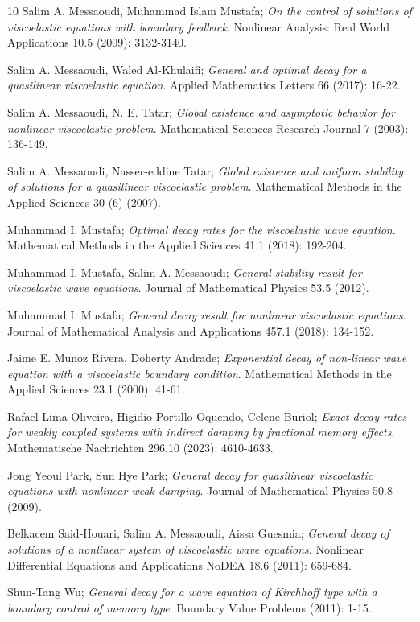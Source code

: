 \documentclass[11pt]{article}
\numberwithin{equation}{section}
\begin{document}
\begin{thebibliography}{10}
 Salim A. Messaoudi,  Muhammad Islam Mustafa;
\emph{On the control of solutions of viscoelastic equations with boundary feedback}.
 Nonlinear Analysis: Real World Applications 10.5 (2009): 3132-3140.
 
 Salim A. Messaoudi, Waled Al-Khulaifi;
\emph{General and optimal decay for a quasilinear viscoelastic equation}.
Applied Mathematics Letters 66 (2017): 16-22.

 Salim A. Messaoudi,  N. E. Tatar;
\emph{Global existence and asymptotic behavior for nonlinear viscoelastic problem}.
 Mathematical Sciences Research Journal 7 (2003): 136-149.
 
 Salim A. Messaoudi,  Nasser-eddine Tatar;
\emph{Global existence and uniform stability of solutions for a quasilinear 
viscoelastic problem}. Mathematical Methods in the Applied Sciences 30 (6) (2007).

 Muhammad I. Mustafa;
\emph{Optimal decay rates for the viscoelastic wave equation}.
 Mathematical Methods in the Applied Sciences 41.1 (2018): 192-204.
 
 Muhammad I. Mustafa, Salim A. Messaoudi;
\emph{General stability result for viscoelastic wave equations}.
 Journal of Mathematical Physics 53.5 (2012).
 
 Muhammad I. Mustafa;
\emph{General decay result for nonlinear viscoelastic equations}.
 Journal of Mathematical Analysis and Applications 457.1 (2018): 134-152.
 
  Jaime E. Munoz Rivera, Doherty Andrade;
\emph{Exponential decay of non-linear wave equation with a viscoelastic boundary 
condition}. Mathematical Methods in the Applied Sciences 23.1 (2000): 41-61.


 Rafael Lima Oliveira, Higidio Portillo Oquendo, Celene Buriol;
\emph{Exact decay rates for weakly coupled systems with indirect damping by 
fractional memory effects}. Mathematische Nachrichten 296.10 (2023): 4610-4633.

 Jong Yeoul Park, Sun Hye Park;
\emph{General decay for quasilinear viscoelastic equations with nonlinear weak damping}.
 Journal of Mathematical Physics 50.8 (2009).
 
  Belkacem Said-Houari, Salim A. Messaoudi, Aissa Guesmia;
\emph{General decay of solutions of a nonlinear system of viscoelastic wave equations}.
Nonlinear Differential Equations and Applications NoDEA 18.6 (2011): 659-684.

 Shun-Tang Wu;
\emph{General decay for a wave equation of Kirchhoff type with a boundary control 
of memory type}. Boundary Value Problems (2011): 1-15.

\end{thebibliography}
\end{document}
